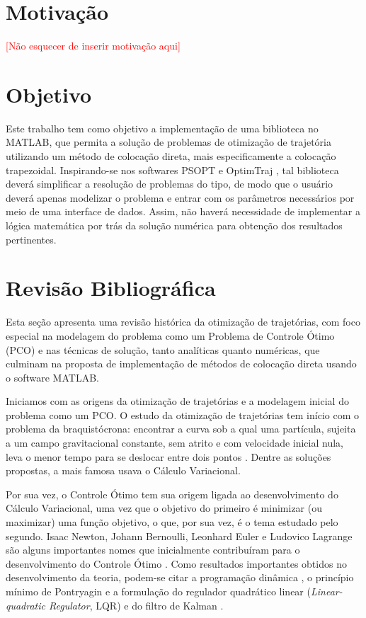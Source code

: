 \section{Motivação}
\label{sec:motivação}

\textcolor{red}{[Não esquecer de inserir motivação aqui]}


\section{Objetivo}
\label{sec:objetivo}

Este trabalho tem como objetivo a implementação de uma biblioteca no MATLAB, que permita a solução de problemas de otimização de trajetória utilizando um método de colocação direta, mais especificamente a colocação trapezoidal. Inspirando-se nos softwares PSOPT \cite{becerra_psopt_2022} e OptimTraj \cite{kelly_optimtraj_2022}, tal biblioteca deverá simplificar a resolução de problemas do tipo, de modo que o usuário deverá apenas modelizar o problema e entrar com os parâmetros necessários por meio de uma interface de dados. Assim, não haverá necessidade de implementar a lógica matemática por trás da solução numérica para obtenção dos resultados pertinentes.


\section{Revisão Bibliográfica}
\label{sec:rev-bibliografica}

Esta seção apresenta uma revisão histórica da otimização de trajetórias, com foco especial na modelagem do problema como um Problema de Controle Ótimo (PCO) e nas técnicas de solução, tanto analíticas quanto numéricas, que culminam na proposta de implementação de métodos de colocação direta usando o software MATLAB.


Iniciamos com as origens da otimização de trajetórias e a modelagem inicial do problema como um PCO. O estudo da otimização de trajetórias tem início com o problema da braquistócrona: encontrar a curva sob a qual uma partícula, sujeita a um campo gravitacional constante, sem atrito e com velocidade inicial nula, leva o menor tempo para se deslocar entre dois pontos \cite{sussmann_300_1997}. Dentre as soluções propostas, a mais famosa usava o Cálculo Variacional.

Por sua vez, o Controle Ótimo tem sua origem ligada ao desenvolvimento do Cálculo Variacional, uma vez que o objetivo do primeiro é minimizar (ou maximizar) uma função objetivo, o que, por sua vez, é o tema estudado pelo segundo. Isaac Newton, Johann Bernoulli, Leonhard Euler e Ludovico Lagrange são alguns importantes nomes que inicialmente contribuíram para o desenvolvimento do Controle Ótimo \cite{becerra_optimal_2008}. Como resultados importantes obtidos no desenvolvimento da teoria, podem-se citar a programação dinâmica \cite{bellman_dynamic_2010}, o princípio mínimo de Pontryagin \cite{pontryagin_mathematical_1987} e a formulação do regulador quadrático linear (\textit{Linear-quadratic Regulator}, LQR) e do filtro de Kalman \cite{kalman_contributions_1960, kalman_new_1960}.

